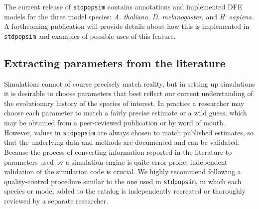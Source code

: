 \documentclass[hidelinks]{article}
\newcommand{\stdpopsim}{\texttt{stdpopsim}\xspace}
\begin{document}
The current release of \stdpopsim contains annotations and implemented DFE models for the
three model species: {\em A. thaliana}, {\em D. melanogaster}, and {\em H. sapiens}.
A forthcoming publication will provide details about how this is implemented in \stdpopsim
and examples of possible uses of this feature.

\subsection*{Extracting parameters from the literature}

Simulations cannot of course precisely match reality, but in setting up simulations
it is desirable to choose parameters that best reflect our current understanding of the evolutionary history of the species of interest.
In practice a researcher may choose each parameter to match a fairly precise estimate or a wild guess,
which may be obtained from a peer-reviewed publication or by word of mouth.
However, values in \stdpopsim are always chosen to match published estimates,
so that the underlying data and methods are documented and can be validated.
Because the process of converting information reported in the literature to parameters used by a simulation engine is quite error-prone,
independent validation of the simulation code is crucial.
We highly recommend following a quality-control procedure similar to the one used in \stdpopsim,
in which each species or model added to the catalog is independently recreated or thoroughly reviewed by a separate researcher.
\end{document}

